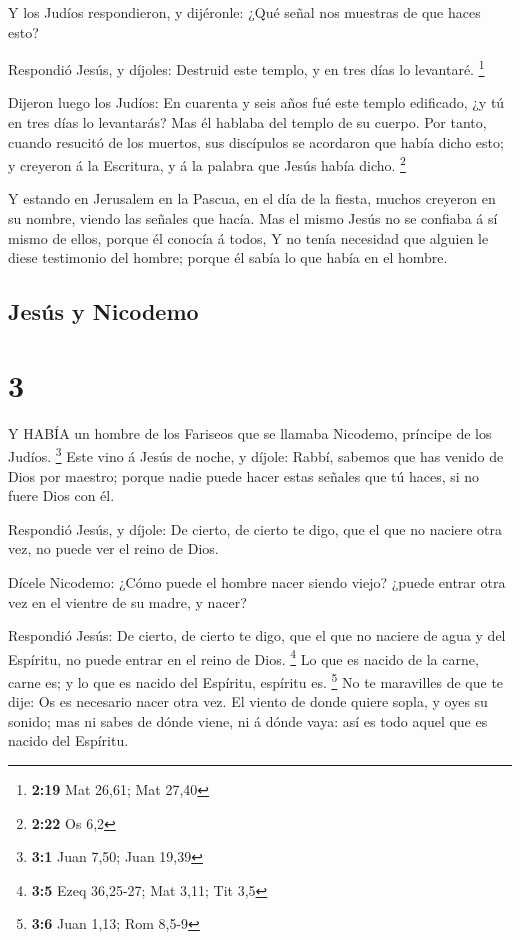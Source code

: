  Y los Judíos respondieron, y dijéronle: ¿Qué señal nos
muestras de que haces esto?

 Respondió Jesús, y díjoles: Destruid este templo, y en
tres días lo levantaré. \footnote{\textbf{2:19} Mat 26,61; Mat 27,40}

 Dijeron luego los Judíos: En cuarenta y seis años fué este
templo edificado, ¿y tú en tres días lo levantarás?  Mas él
hablaba del templo de su cuerpo.  Por tanto, cuando
resucitó de los muertos, sus discípulos se acordaron que había dicho
esto; y creyeron á la Escritura, y á la palabra que Jesús había dicho.
\footnote{\textbf{2:22} Os 6,2}

 Y estando en Jerusalem en la Pascua, en el día de la
fiesta, muchos creyeron en su nombre, viendo las señales que hacía.
 Mas el mismo Jesús no se confiaba á sí mismo de ellos,
porque él conocía á todos,  Y no tenía necesidad que
alguien le diese testimonio del hombre; porque él sabía lo que había en
el hombre.

\hypertarget{jesuxfas-y-nicodemo}{%
\subsection{Jesús y Nicodemo}\label{jesuxfas-y-nicodemo}}

\hypertarget{section-2}{%
\section{3}\label{section-2}}

 Y HABÍA un hombre de los Fariseos que se llamaba Nicodemo,
príncipe de los Judíos. \footnote{\textbf{3:1} Juan 7,50; Juan 19,39}
 Este vino á Jesús de noche, y díjole: Rabbí, sabemos que
has venido de Dios por maestro; porque nadie puede hacer estas señales
que tú haces, si no fuere Dios con él.

 Respondió Jesús, y díjole: De cierto, de cierto te digo,
que el que no naciere otra vez, no puede ver el reino de Dios.

 Dícele Nicodemo: ¿Cómo puede el hombre nacer siendo viejo?
¿puede entrar otra vez en el vientre de su madre, y nacer?

 Respondió Jesús: De cierto, de cierto te digo, que el que
no naciere de agua y del Espíritu, no puede entrar en el reino de Dios.
\footnote{\textbf{3:5} Ezeq 36,25-27; Mat 3,11; Tit 3,5}  Lo
que es nacido de la carne, carne es; y lo que es nacido del Espíritu,
espíritu es. \footnote{\textbf{3:6} Juan 1,13; Rom 8,5-9} 
No te maravilles de que te dije: Os es necesario nacer otra vez.
 El viento de donde quiere sopla, y oyes su sonido; mas ni
sabes de dónde viene, ni á dónde vaya: así es todo aquel que es nacido
del Espíritu.


